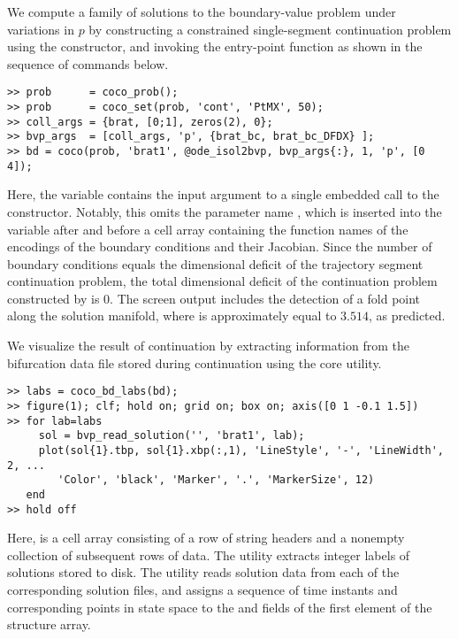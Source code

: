 We compute a family of solutions to the boundary-value problem under variations in $p$ by constructing a constrained single-segment continuation problem using the  constructor, and invoking the  entry-point function as shown in the sequence of commands below.
\begin{lstlisting}[language=coco-highlight]
>> prob      = coco_prob();
>> prob      = coco_set(prob, 'cont', 'PtMX', 50);
>> coll_args = {brat, [0;1], zeros(2), 0};
>> bvp_args  = [coll_args, 'p', {brat_bc, brat_bc_DFDX} ];
>> bd = coco(prob, 'brat1', @ode_isol2bvp, bvp_args{:}, 1, 'p', [0 4]);
\end{lstlisting}
Here, the  variable contains the input argument to a single embedded call to the  constructor. Notably, this omits the parameter name , which is inserted into the  variable after  and before a cell array containing the function names of the encodings of the boundary conditions and their Jacobian. Since the number of boundary conditions equals the dimensional deficit of the trajectory segment continuation problem, the total dimensional deficit of the continuation problem constructed by  is $0$. The screen output includes the detection of a fold point along the solution manifold, where  is approximately equal to $3.514$, as predicted.


We visualize the result of continuation by extracting information from the bifurcation data file stored during continuation using the  core utility.
\begin{lstlisting}[language=coco-highlight]
>> labs = coco_bd_labs(bd);
>> figure(1); clf; hold on; grid on; box on; axis([0 1 -0.1 1.5])
>> for lab=labs
     sol = bvp_read_solution('', 'brat1', lab);
     plot(sol{1}.tbp, sol{1}.xbp(:,1), 'LineStyle', '-', 'LineWidth', 2, ...
        'Color', 'black', 'Marker', '.', 'MarkerSize', 12)
   end
>> hold off
\end{lstlisting}
Here,  is a cell array consisting of a row of string headers and a nonempty collection of subsequent rows of data. The  utility extracts integer labels of solutions stored to disk. The  utility reads solution data from each of the corresponding solution files, and assigns a sequence of time instants and corresponding points in state space to the  and  fields of the first element of the  structure array.

